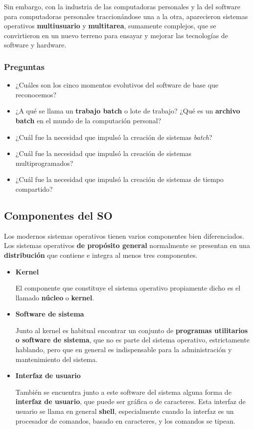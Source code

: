 \documentclass[spanish,A4,]{article}
\begin{document}
Sin embargo, con la industria de las computadoras personales y la del
software para computadoras personales traccionándose una a la otra,
aparecieron sistemas operativos \textbf{multiusuario} y
\textbf{multitarea}, sumamente complejos, que se convirtieron en un
nuevo terreno para ensayar y mejorar las tecnologías de software y
hardware.

\subsubsection{Preguntas}\label{preguntas}

\begin{itemize}
\itemsep1pt\parskip0pt
\item
  ¿Cuáles son los cinco momentos evolutivos del software de base que
  reconocemos?
\item
  ¿A qué se llama un \textbf{trabajo batch} o lote de trabajo? ¿Qué es
  un \textbf{archivo batch} en el mundo de la computación personal?
\item
  ¿Cuál fue la necesidad que impulsó la creación de sistemas
  \emph{batch}?
\item
  ¿Cuál fue la necesidad que impulsó la creación de sistemas
  multiprogramados?
\item
  ¿Cuál fue la necesidad que impulsó la creación de sistemas de tiempo
  compartido?
\end{itemize}

\subsection{Componentes del SO}\label{componentes-del-so}

Los modernos sistemas operativos tienen varios componentes bien
diferenciados. Los sistemas operativos \textbf{de propósito general}
normalmente se presentan en una \textbf{distribución} que contiene e
integra al menos tres componentes.

\begin{itemize}
\item
  \textbf{Kernel}

  El componente que constituye el sistema operativo propiamente dicho es
  el llamado \textbf{núcleo} o \textbf{kernel}.
\item
  \textbf{Software de sistema}

  Junto al kernel es habitual encontrar un conjunto de \textbf{programas
  utilitarios o software de sistema}, que no es parte del sistema
  operativo, estrictamente hablando, pero que en general es
  indispensable para la administración y mantenimiento del sistema.
\item
  \textbf{Interfaz de usuario}

  También se encuentra junto a este software del sistema alguna forma de
  \textbf{interfaz de usuario}, que puede ser gráfica o de caracteres.
  Esta interfaz de usuario se llama en general \textbf{shell},
  especialmente cuando la interfaz es un procesador de comandos, basado
  en caracteres, y los comandos se tipean.
\end{itemize}
\end{document}
